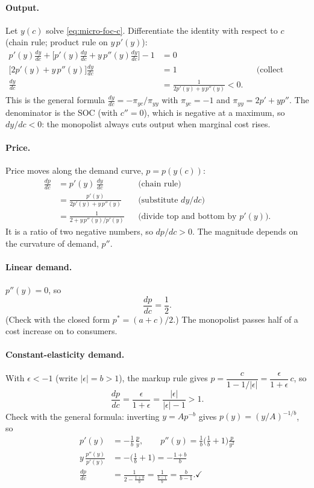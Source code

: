 \paragraph{Output.} Let $y(c)$ solve \eqref{eq:micro-foc-c}. Differentiate the identity with respect to $c$ (chain rule; product rule on $y\,p'(y)$):
\begin{align*}
p'(y)\frac{dy}{dc}+\Big[p'(y)\frac{dy}{dc}+y\,p''(y)\frac{dy}{dc}\Big]-1&=0\\
\big[2p'(y)+y\,p''(y)\big]\frac{dy}{dc}&=1 &&\text{(collect terms)}\\
\frac{dy}{dc}&=\frac{1}{2p'(y)+y\,p''(y)}<0 .
\end{align*}
This is the general formula $\frac{dy}{dc}=-\pi_{yc}/\pi_{yy}$ with $\pi_{yc}=-1$ and $\pi_{yy}=2p'+yp''$. The denominator is the SOC (with $c''=0$), which is negative at a maximum, so $dy/dc<0$: the monopolist always cuts output when marginal cost rises.

\paragraph{Price.} Price moves along the demand curve, $p=p(y(c))$:
\begin{align*}
\frac{dp}{dc}&=p'(y)\,\frac{dy}{dc} &&\text{(chain rule)}\\
&=\frac{p'(y)}{2p'(y)+y\,p''(y)} &&\text{(substitute $dy/dc$)}\\
&=\frac{1}{2+y\,p''(y)/p'(y)} &&\text{(divide top and bottom by $p'(y)$).}
\end{align*}
It is a ratio of two negative numbers, so $dp/dc>0$. The magnitude depends on the curvature of demand, $p''$.

\paragraph{Linear demand.} $p''(y)=0$, so
\[
\frac{dp}{dc}=\frac12 .
\]
(Check with the closed form $p^*=(a+c)/2$.) The monopolist passes half of a cost increase on to consumers.

\paragraph{Constant-elasticity demand.} With $\epsilon<-1$ (write $|\epsilon|=b>1$), the markup rule gives $p=\dfrac{c}{1-1/|\epsilon|}=\dfrac{\epsilon}{1+\epsilon}\,c$, so
\[
\frac{dp}{dc}=\frac{\epsilon}{1+\epsilon}=\frac{|\epsilon|}{|\epsilon|-1}>1 .
\]
Check with the general formula: inverting $y=Ap^{-b}$ gives $p(y)=(y/A)^{-1/b}$, so
\begin{align*}
p'(y)&=-\frac1b\,\frac{p}{y},\qquad p''(y)=\frac1b\Big(\frac1b+1\Big)\frac{p}{y^2}\\
y\,\frac{p''(y)}{p'(y)}&=-\Big(\frac1b+1\Big)=-\frac{1+b}{b}\\
\frac{dp}{dc}&=\frac{1}{2-\frac{1+b}{b}}=\frac{1}{\frac{b-1}{b}}=\frac{b}{b-1}. \checkmark
\end{align*}

